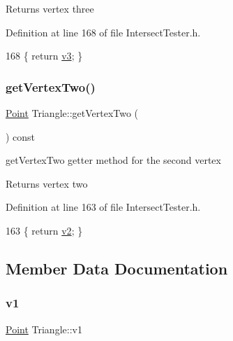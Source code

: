 \begin{DoxyReturn}{Returns}
vertex three 
\end{DoxyReturn}


Definition at line 168 of file Intersect\+Tester.\+h.


\begin{DoxyCode}
168 \{ \textcolor{keywordflow}{return} \hyperlink{class_triangle_a9ffab42f55ebdbaa549cb1cc592b1c76}{v3}; \} 
\end{DoxyCode}
\mbox{\label{class_triangle_ac1ae7463f829bcf377fd926b1ad10cac}} 
\subsubsection{\texorpdfstring{get\+Vertex\+Two()}{getVertexTwo()}}
{\footnotesize\ttfamily \hyperlink{class_point}{Point} Triangle\+::get\+Vertex\+Two (\begin{DoxyParamCaption}{ }\end{DoxyParamCaption}) const\hspace{0.3cm}{\ttfamily [inline]}}



get\+Vertex\+Two getter method for the second vertex 

\begin{DoxyReturn}{Returns}
vertex two 
\end{DoxyReturn}


Definition at line 163 of file Intersect\+Tester.\+h.


\begin{DoxyCode}
163 \{ \textcolor{keywordflow}{return} \hyperlink{class_triangle_a23721a1b58e5e427c1ac65e311e2828d}{v2}; \} 
\end{DoxyCode}


\subsection{Member Data Documentation}
\mbox{\label{class_triangle_a64531c5c908b4ba8aca8b619b97a17bc}} 
\subsubsection{\texorpdfstring{v1}{v1}}
{\footnotesize\ttfamily \hyperlink{class_point}{Point} Triangle\+::v1}



